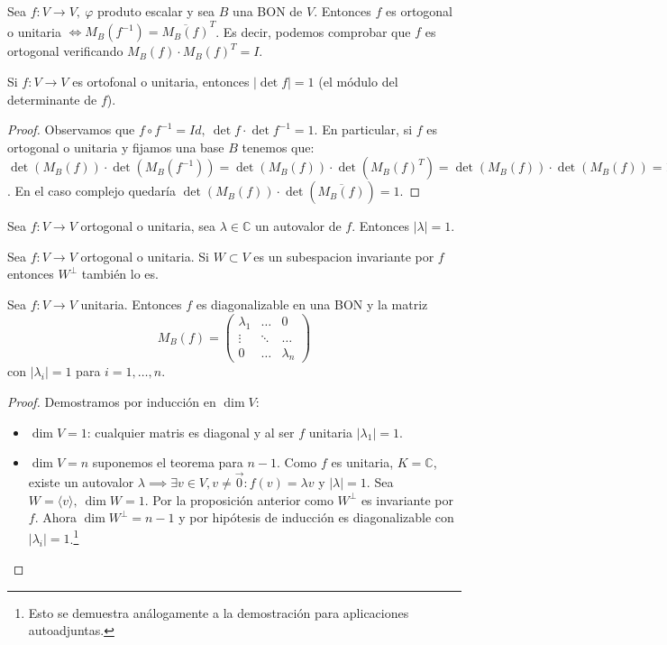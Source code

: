 \documentclass[14pt]{book}
\begin{document}
\begin{tm}
	Sea $f: V \to V,\ \varphi$ produto escalar y sea $B$ una BON de $V$. Entonces $f$ es ortogonal o unitaria $\iff M_B(f^{-1}) = \overline{M_B(f)}^T$. Es decir, podemos comprobar que $f$ es ortogonal verificando $M_B(f) \cdot M_B(f)^T = I$.
\end{tm}

\begin{obs}
	Si $f: V \to V$ es ortofonal o unitaria, entonces $|\det f| = 1$ (el módulo del determinante de $f$).
\end{obs}
\begin{proof}
	Observamos que $f \circ f^{-1} = Id,\ \det f \cdot \det f^{-1} = 1$. En particular, si $f$ es ortogonal o unitaria y fijamos una base $B$ tenemos que: $\det(M_B(f))\cdot \det(M_B(f^{-1})) = \det(M_B(f))\cdot \det(M_B(f)^T) = \det(M_B(f))\cdot \det(M_B(f)) = 1$. En el caso complejo quedaría $\det(M_B(f))\cdot \det(\overline{M_B(f)}) = 1$.
\end{proof}

\begin{pro}
	Sea $f: V \to V$ ortogonal o unitaria, sea $\lambda \in \mathbb{C}$ un autovalor de $f$. Entonces $|\lambda| = 1$.
\end{pro}

\begin{pro}
	Sea $f: V \to V$ ortogonal o unitaria. Si $W \subset V$ es un subespacion invariante por $f$ entonces $W^\perp$ también lo es.
\end{pro}

\begin{tm}
	Sea $f : V \to V$ unitaria. Entonces $f$ es diagonalizable en una BON y la matriz
	\[
	M_B(f) = \left(\begin{array}{ccc}
	\lambda_1 &\dots &0\\
	\vdots &\ddots &\dots\\
	0 & \dots & \lambda_n
	\end{array}
	\right)
	\]
	con $|\lambda_i| = 1$ para $i = 1, \dots, n$.
\end{tm}

\begin{proof}
	Demostramos por inducción en $\dim V$:
	\begin{itemize}
		\item $\dim V = 1$: cualquier matris es diagonal y al ser $f$ unitaria $|\lambda_1| = 1$.
		\item $\dim V = n$ suponemos el teorema para $n - 1$. Como $f$ es unitaria, $K = \mathbb{C}$, existe un autovalor $\lambda \implies \exists v \in V, v ≠ \vec{0} : f(v) = \lambda v$ y $|\lambda| = 1$. Sea $W = \langle v \rangle,\ \dim W = 1$. Por la proposición anterior como $W^\perp$ es invariante por $f$. Ahora $\dim W^\perp = n - 1$ y por hipótesis de inducción es diagonalizable con $|\lambda_i| = 1$.\footnote{Esto se demuestra análogamente a la demostración para aplicaciones autoadjuntas.}
	\end{itemize}
\end{proof}
\end{document}
